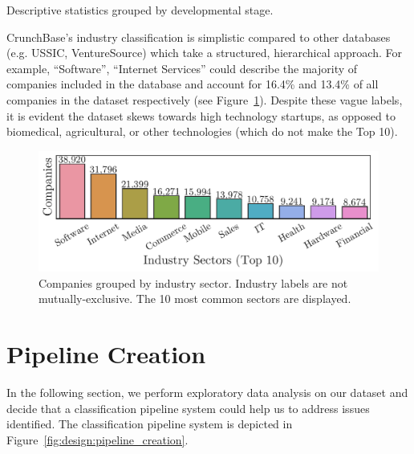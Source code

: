 \documentclass[../thesis/thesis.tex]{subfiles}
\begin{document}
\begin{table}[!htb]
    \centering
    \scalebox{0.9}{}
    \caption[Descriptive statistics by developmental stage]{Descriptive statistics grouped by developmental stage.}
    \label{tab:design:descriptive_statistics}
\end{table}

CrunchBase's industry classification is simplistic compared to other databases (e.g. USSIC, VentureSource) which take a structured, hierarchical approach. For example, ``Software'', ``Internet Services'' could describe the majority of companies included in the database and account for 16.4\% and 13.4\% of all companies in the dataset respectively (see Figure~\ref{fig:design:industry_counts}). Despite these vague labels, it is evident the dataset skews towards high technology startups, as opposed to biomedical, agricultural, or other technologies (which do not make the Top 10).

\begin{figure}[!htb]
    \centering
    \includegraphics[width=\textwidth]{../figures/design/descriptives_counts_industry}
    \caption[Company counts by industry sector]{Companies grouped by industry sector. Industry labels are not mutually-exclusive. The 10 most common sectors are displayed.}
    \label{fig:design:industry_counts}
\end{figure}

\section{Pipeline Creation}

In the following section, we perform exploratory data analysis on our dataset and decide that a classification pipeline system could help us to address issues identified. The classification pipeline system is depicted in Figure~\ref{fig:design:pipeline_creation}.
\end{document}
